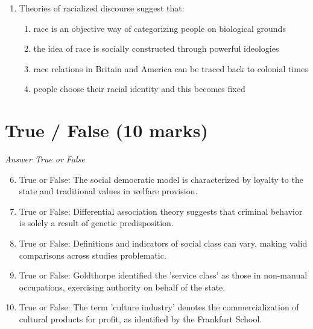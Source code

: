 \documentclass[12pt]{article}
\begin{document}
\begin{enumerate}[label=\arabic*.]
\begin{enumerate}[label=(\alph*)]
    \item the mass production of standardized products for passive audiences
    \item television based on producer-broadcaster rather than publisher-broadcaster models
    \item a diverse range of products aimed at niche markets
    \item increasing numbers of advertisements for motoring and car-related products
\end{enumerate}
\item Theories of racialized discourse suggest that:
\begin{enumerate}[label=(\alph*)]
    \item race is an objective way of categorizing people on biological grounds
    \item the idea of race is socially constructed through powerful ideologies
    \item race relations in Britain and America can be traced back to colonial times
    \item people choose their racial identity and this becomes fixed
\end{enumerate}
\end{enumerate}

\section*{True / False (10 marks)}
\textit{Answer True or False}
\begin{enumerate}[label=\arabic*.]
\setcounter{enumi}{5}
\item True or False: The social democratic model is characterized by loyalty to the state and traditional values in welfare provision.
\item True or False: Differential association theory suggests that criminal behavior is solely a result of genetic predisposition.
\item True or False: Definitions and indicators of social class can vary, making valid comparisons across studies problematic.
\item True or False: Goldthorpe identified the 'service class' as those in non-manual occupations, exercising authority on behalf of the state.
\item True or False: The term 'culture industry' denotes the commercialization of cultural products for profit, as identified by the Frankfurt School.
\end{enumerate}
\end{document}
